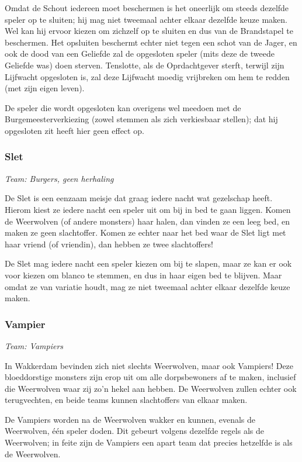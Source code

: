 \documentclass[12pt]{article}
\begin{document}
      Omdat de Schout iedereen moet beschermen is het oneerlijk om steeds dezelfde speler op te sluiten; hij mag niet tweemaal achter elkaar dezelfde keuze maken. Wel kan hij ervoor kiezen om zichzelf op te sluiten en dus van de Brandstapel te beschermen. Het opsluiten beschermt echter niet tegen een schot van de Jager, en ook de dood van een Geliefde zal de opgesloten speler (mits deze de tweede Geliefde was) doen sterven. Tenslotte, als de Oprdachtgever sterft, terwijl zijn Lijfwacht opgesloten is, zal deze Lijfwacht moedig vrijbreken om hem te redden (met zijn eigen leven).
    
      De speler die wordt opgesloten kan overigens wel meedoen met de Burgemeesterverkiezing (zowel stemmen als zich verkiesbaar stellen); dat hij opgesloten zit heeft hier geen effect op.
    
    \subsubsection{Slet}
      \emph{\scriptsize Team: Burgers, geen herhaling}
    
      De Slet is een eenzaam meisje dat graag iedere nacht wat gezelschap heeft. Hierom kiest ze iedere nacht een speler uit om bij in bed te gaan liggen. Komen de Weerwolven (of andere monsters) haar halen, dan vinden ze een leeg bed, en maken ze geen slachtoffer. Komen ze echter naar het bed waar de Slet ligt met haar vriend (of vriendin), dan hebben ze twee slachtoffers!
    
      De Slet mag iedere nacht een speler kiezen om bij te slapen, maar ze kan er ook voor kiezen om blanco te stemmen, en dus in haar eigen bed te blijven. Maar omdat ze van variatie houdt, mag ze niet tweemaal achter elkaar dezelfde keuze maken.
    
    \subsubsection{Vampier}
      \emph{\scriptsize Team: Vampiers}
    
      In Wakkerdam bevinden zich niet slechts Weerwolven, maar ook Vampiers! Deze bloeddorstige monsters zijn erop uit om alle dorpsbewoners af te maken, inclusief die Weerwolven waar zij zo'n hekel aan hebben. De Weerwolven zullen echter ook terugvechten, en beide teams kunnen slachtoffers van elkaar maken.
    
      De Vampiers worden na de Weerwolven wakker en kunnen, evenals de Weerwolven, \'e\'en speler doden. Dit gebeurt volgens dezelfde regels als de Weerwolven; in feite zijn de Vampiers een apart team dat precies hetzelfde is als de Weerwolven.
    
\end{document}
